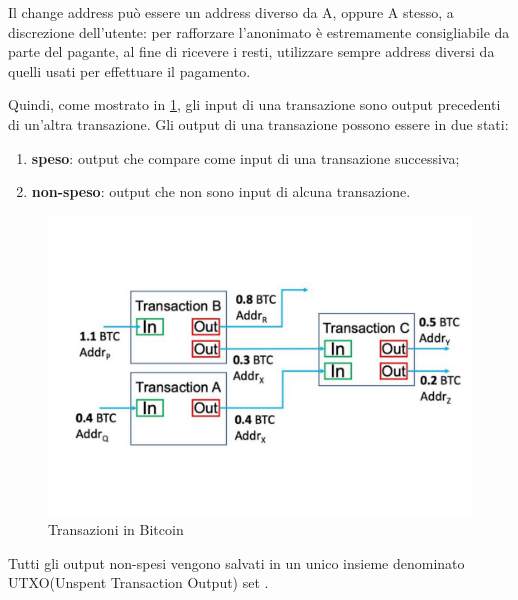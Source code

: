 Il change address può essere un address diverso da A, oppure A stesso, a discrezione dell’utente: per rafforzare l’anonimato è estremamente consigliabile da parte del pagante, al fine di ricevere i resti, utilizzare sempre address diversi da quelli usati per effettuare il pagamento.

Quindi, come mostrato in \ref{fig:transaction}, gli input di una transazione sono output precedenti di un'altra transazione. Gli output di una transazione possono essere in due stati:
\begin{enumerate}
    \item \textbf{speso}: output che compare come input di una transazione successiva;
    \item \textbf{non-speso}: output che non sono input di alcuna transazione.
\end{enumerate}
\begin{figure}[h!]
    \centering
    \includegraphics[scale=0.4, trim = 1cm 2cm 0cm 3cm, clip]{Images/Transactions-input-and-output-in-blockchain.jpg.pdf}
    \caption{Transazioni in Bitcoin}
    \label{fig:transaction}
\end{figure}
\FloatBarrier

Tutti gli output non-spesi vengono salvati in un unico insieme denominato UTXO(Unspent Transaction Output) set \cite{utxo}.

